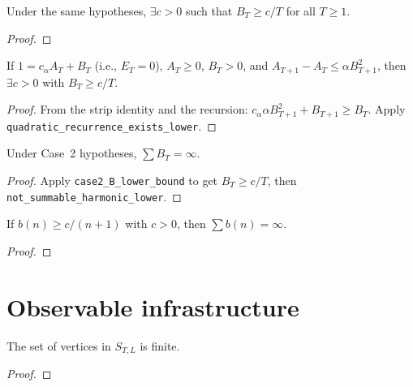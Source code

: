 \begin{theorem}\label{thm:quad_exist}
\leanok
{}
  Under the same hypotheses, $\exists c > 0$ such that
  $B_T \geq c/T$ for all $T \geq 1$.
\end{theorem}
\begin{proof}
\leanok
\end{proof}

\begin{theorem}\label{thm:case2_lower}
\leanok
{}
  If $1 = c_\alpha A_T + B_T$ (i.e., $E_T = 0$), $A_T \geq 0$, $B_T > 0$,
  and $A_{T+1} - A_T \leq \alpha B_{T+1}^2$, then
  $\exists c > 0$ with $B_T \geq c/T$.
\end{theorem}
\begin{proof}
\leanok
{}
  From the strip identity and the recursion: $c_\alpha \alpha B_{T+1}^2 + B_{T+1} \geq B_T$.
  Apply \texttt{quadratic\_recurrence\_exists\_lower}.
\end{proof}

\begin{theorem}\label{thm:case2_diverge}
\leanok
{}
  Under Case~2 hypotheses, $\sum B_T = \infty$.
\end{theorem}
\begin{proof}
\leanok
{}
  Apply \texttt{case2\_B\_lower\_bound} to get $B_T \geq c/T$,
  then \texttt{not\_summable\_harmonic\_lower}.
\end{proof}

\begin{lemma}\label{lem:harmonic_div}
\leanok
  If $b(n) \geq c/(n+1)$ with $c > 0$, then $\sum b(n) = \infty$.
\end{lemma}
\begin{proof}
\leanok
\end{proof}

\section{Observable infrastructure}

\begin{lemma}\label{lem:paper_strip_finite}
\leanok
{}
  The set of vertices in $S_{T,L}$ is finite.
\end{lemma}
\begin{proof}
\leanok
\end{proof}

